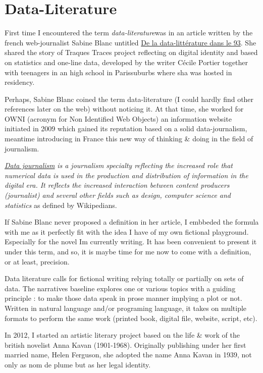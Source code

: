 \section{Data-Literature}

First time I encountered the term \textit{data-literature}was in an article written by the french web-journalist Sabine Blanc untitled {\textquotedbl} \href{http://owni.fr/2011/03/18/de-la-datalitterature-dans-le-9-3/}{De
la data-litt\'erature dans le 93}{\textquotedbl}. She shared the story
of {\textquotedbl}Traques Traces{\textquotedbl} project reflecting on
digital identity and based on statistics and one-line data, developed
by the writer C\'ecile Portier together with teenagers in an high
school in Paris{\textquotesingle}suburbs where sha was hosted in
residency.

Perhaps, Sabine Blanc coined the term data-literature (I could hardly
find other references later on the web) without noticing it. At that
time, she worked for OWNI (acronym for Non Identified Web Objects) an
information website initiated in 2009 which gained its reputation based
on a solid data-journalism, meantime introducing in France this new way
of thinking \& doing in the field of journalism.

\href{https://en.wikipedia.org/wiki/Data_journalism}{\textit{Data
journalism}}\textit{ is a journalism specialty reflecting
the increased role that numerical data is used in the production and
distribution of information in the digital era. It reflects the
increased interaction between content producers (journalist) and
several other fields such as design, computer science and statistics}
as defined by Wikipedians.~

If Sabine Blanc never proposed a definition in her article, I embbeded
the formula with me as it perfectly fit with the idea I have of my own
fictional playground. Especially for the novel I{\textquotesingle}m
currently writing. It has been convenient to present it under this
term, and so, it is maybe time for me now to come with a definition, or
at least, precision.

Data literature calls for fictional writing relying totally or partially
on sets of data. The narratives baseline explores one or various topics
with a guiding principle : to make those data speak in prose manner
implying a plot or not. Written in natural language and/or programing
language, it takes on multiple formats to perform the same work
(printed book, digital file, website, script, etc).

In 2012, I started an artistic literary project based on the life \&
work of the british novelist Anna Kavan (1901-1968). Originally
publishing under her first married name, Helen Ferguson, she adopted
the name Anna Kavan in 1939, not only as nom de plume but as her legal
identity.

